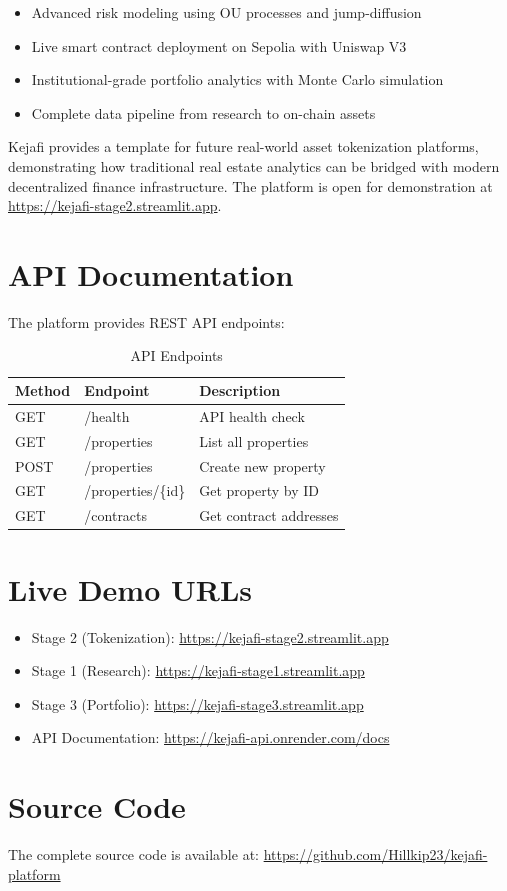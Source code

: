 ﻿\documentclass[12pt]{article}
\begin{document}
\begin{itemize}
    \item Advanced risk modeling using OU processes and jump-diffusion
    \item Live smart contract deployment on Sepolia with Uniswap V3
    \item Institutional-grade portfolio analytics with Monte Carlo simulation
    \item Complete data pipeline from research to on-chain assets
\end{itemize}

Kejafi provides a template for future real-world asset tokenization platforms, demonstrating how traditional real estate analytics can be bridged with modern decentralized finance infrastructure. The platform is open for demonstration at \url{https://kejafi-stage2.streamlit.app}.




\appendix

\section{API Documentation}

The platform provides REST API endpoints:

\begin{table}[H]
\centering
\caption{API Endpoints}
\label{tab:api}
\begin{tabular}{@{}lll@{}}
\toprule
\textbf{Method} & \textbf{Endpoint} & \textbf{Description} \\
\midrule
GET & /health & API health check \\
GET & /properties & List all properties \\
POST & /properties & Create new property \\
GET & /properties/\{id\} & Get property by ID \\
GET & /contracts & Get contract addresses \\
\bottomrule
\end{tabular}
\end{table}

\section{Live Demo URLs}

\begin{itemize}
    \item Stage 2 (Tokenization): \url{https://kejafi-stage2.streamlit.app}
    \item Stage 1 (Research): \url{https://kejafi-stage1.streamlit.app}
    \item Stage 3 (Portfolio): \url{https://kejafi-stage3.streamlit.app}
    \item API Documentation: \url{https://kejafi-api.onrender.com/docs}
\end{itemize}

\section{Source Code}

The complete source code is available at:
\url{https://github.com/Hillkip23/kejafi-platform}
\end{document}
